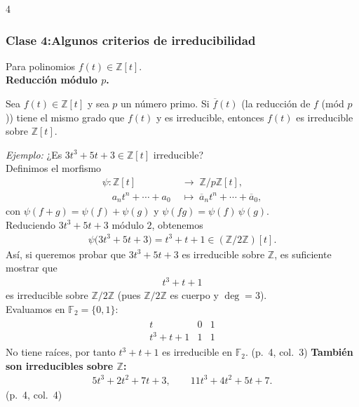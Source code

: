 \documentclass[landscape,a4paper]{article}
\begin{document}
\begin{multicols}{4}
\subsubsection*{Clase 4:Algunos criterios de irreducibilidad}
\noindent Para polinomios $f(t) \in \mathbb{Z}[t]$.\\
\noindent \textbf{Reducción módulo $p$.}\\
\begin{tcolorbox}[colback=white,colframe=red!80!black,colbacktitle=red!80!black,coltitle=white,title={Teorema: Reducción módulo $p$ (p.~4, col.~1)}]
Sea $f(t)\in\mathbb{Z}[t]$ y sea $p$ un número primo. Si $\overline{f}(t)$ (la reducción de $f$  (mód $p$)) tiene el mismo grado que $f(t)$ y es irreducible, entonces $f(t)$ es irreducible sobre $\mathbb{Z}[t]$.
\end{tcolorbox}
\noindent \emph{Ejemplo:} ¿Es $3t^3 + 5t + 3 \in \mathbb{Z}[t]$ irreducible?\\
Definimos el morfismo
\begin{align*}
\psi: \mathbb{Z}[t] \;&\longrightarrow\; \mathbb{Z}/p\mathbb{Z}[t], \\
\quad 
a_n t^n + \cdots + a_0 \;&\longmapsto\; \overline{a}_n t^n + \cdots + \overline{a}_0,
\end{align*}
con $\psi(f+g)=\psi(f)+\psi(g)$ y $\psi(fg)=\psi(f)\,\psi(g)$.\\
Reduciendo $3t^3 + 5t + 3$ módulo $2$, obtenemos
\begin{align*}
\psi\bigl(3t^3 + 5t + 3\bigr) 
= t^3 + t + 1 \in (\mathbb{Z}/2\mathbb{Z})[t].
\end{align*}
\noindent Así, si queremos probar que $3t^3+5t+3$ es irreducible sobre $\mathbb{Z}$, es suficiente mostrar que 
\begin{align*}
t^3 + t + 1 
\end{align*}
es irreducible sobre $\mathbb{Z}/2\mathbb{Z}$ (pues $\mathbb{Z}/2\mathbb{Z}$ es cuerpo y $\deg=3$).\\
Evaluamos en $\mathbb{F}_2 = \{0,1\}$:
\begin{align*}
\begin{array}{c|cc}
t   & 0 & 1 \\ \hline
t^3+t+1 & 1 & 1
\end{array}
\end{align*}
No tiene raíces, por tanto $t^3+t+1$ es irreducible en $\mathbb{F}_2$. (p.~4, col.~3)
\columnbreak
\noindent \textbf{También son irreducibles sobre $\mathbb{Z}$:}
\begin{align*}
5t^3 + 2t^2 + 7t + 3, 
\qquad
11t^3 + 4t^2 + 5t + 7.
\end{align*}
(p.~4, col.~4)


\end{multicols}
\end{document}
